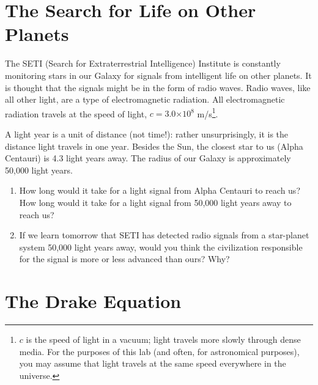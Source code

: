\documentclass[12pt]{article}
\providecommand{\e}[1]{\ensuremath{\times 10^{#1}}} %
\begin{document}
\section{The Search for Life on Other Planets}
The SETI (Search for Extraterrestrial Intelligence) Institute is constantly monitoring stars in our Galaxy for signals from intelligent life on other planets.  
It is thought that the signals might be in the form of radio waves.  
Radio waves, like all other light, are a type of electromagnetic radiation.  
All electromagnetic radiation travels at the speed of light, $c=3.0 \e{8}$ m/s\footnote{$c$ is the speed of light in a vacuum; light travels more slowly through dense media.  For the purposes of this lab (and often, for astronomical purposes), you may assume that light travels at the same speed everywhere in the universe.}. 

A light year is a unit of distance (not time!): rather unsurprisingly, it is the distance light travels in one year.  
Besides the Sun, the closest star to us (Alpha Centauri) is 4.3 light years away.  
The radius of our Galaxy is approximately 50,000 light years.  

\begin{enumerate}

\item How long would it take for a light signal from Alpha Centauri to reach us?  
How long would it take for a light signal from 50,000 light years away to reach us?  %

\item  If we learn tomorrow that SETI has detected radio signals from a star-planet system 50,000 light years away, would you think the civilization responsible for the signal is more or less advanced than ours?  Why? %


\end{enumerate}


\section{The Drake Equation}
\end{document}
